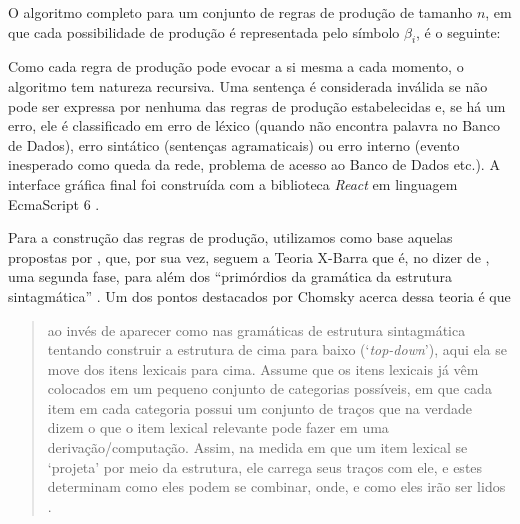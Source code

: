 \documentclass[portuguese]{textolivre}
\begin{document}
O algoritmo completo para um conjunto de regras de produção de tamanho $n$, em que cada possibilidade de produção é representada pelo símbolo $\beta_i$, é o seguinte:

\begin{algorithm}[H]
\SetAlgoLined
\BlankLine
{}
\BlankLine

\BlankLine
\end{algorithm}

Como cada regra de produção pode evocar a si mesma a cada momento, o algoritmo tem natureza recursiva. Uma sentença é considerada inválida se não pode ser expressa por nenhuma das regras de produção estabelecidas e, se há um erro, ele é classificado em erro de léxico (quando não encontra palavra no Banco de Dados), erro sintático (sentenças agramaticais) ou erro interno (evento inesperado como queda da rede, problema de acesso ao Banco de Dados etc.). A interface gráfica final foi construída com a biblioteca \textit{React} em linguagem EcmaScript 6 \cite{ecma_internacional_ecmascriptlanguage_2015}.

Para a construção das regras de produção, utilizamos como base aquelas propostas por \textcite{othero_gramatica_2009}, que, por sua vez, seguem a Teoria X-Barra que é, no dizer de \textcite[p. 389-398]{chomsky__2014}, uma segunda fase, para além dos “primórdios da gramática da estrutura sintagmática” \textcite[p. 390]{chomsky__2014}. Um dos pontos destacados por Chomsky acerca dessa teoria é que 

\begin{quote}
    ao invés de aparecer como nas gramáticas de estrutura sintagmática tentando construir a estrutura de cima para baixo (‘\textit{top-down}’), aqui ela se move dos itens lexicais para cima. Assume que os itens lexicais já vêm colocados em um pequeno conjunto de categorias possíveis, em que cada item em cada categoria possui um conjunto de traços que na verdade dizem o que o item lexical relevante pode fazer em uma derivação/computação. Assim, na medida em que um item lexical se ‘projeta’ por meio da estrutura, ele carrega seus traços com ele, e estes determinam como eles podem se combinar, onde, e como eles irão ser lidos \cite[p. 392]{chomsky__2014}.
\end{quote}
\end{document}
